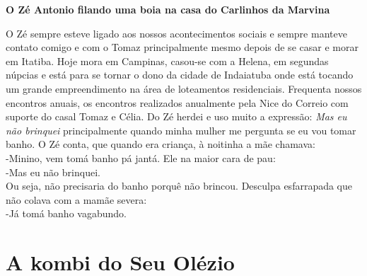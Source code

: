 \documentclass[12pt,brazil,]{book}
\begin{document}
\textbf{O Zé Antonio filando uma boia na casa do Carlinhos da Marvina}

O Zé sempre esteve ligado aos nossos acontecimentos sociais e sempre
manteve contato comigo e com o Tomaz principalmente mesmo depois de se
casar e morar em Itatiba. Hoje mora em Campinas, casou-se com a Helena,
em segundas núpcias e está para se tornar o dono da cidade de Indaiatuba
onde está tocando um grande empreendimento na área de loteamentos
residenciais. Frequenta nossos encontros anuais, os encontros realizados
anualmente pela Nice do Correio com suporte do casal Tomaz e Célia. Do
Zé herdei e uso muito a expressão: \emph{Mas eu não brinquei}
principalmente quando minha mulher me pergunta se eu vou tomar banho. O
Zé conta, que quando era criança, à noitinha a mãe chamava:\\
-Minino, vem tomá banho pá jantá. Ele na maior cara de pau:\\
-Mas eu não brinquei.\\
Ou seja, não precisaria do banho porquê não brincou. Desculpa
esfarrapada que não colava com a mamãe severa:\\
-Já tomá banho vagabundo.

\section{A kombi do Seu Olézio}\label{a-kombi-do-seu-oluxe9zio}
\end{document}
